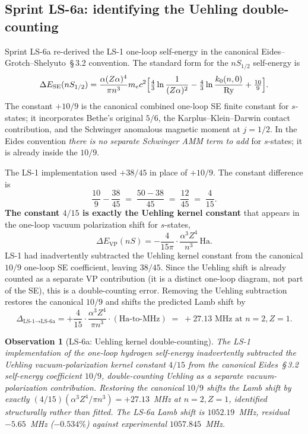 \documentclass[11pt]{article}
\newtheorem{observation}{Observation}
\begin{document}
\subsection{Sprint LS-6a: identifying the Uehling double-counting}

Sprint LS-6a re-derived the LS-1 one-loop self-energy in the canonical
Eides--Grotch--Shelyuto~\S\,3.2 convention.  The standard form for
the $nS_{1/2}$ self-energy is
\begin{equation}
\label{eq:eides_se}
\Delta E_\text{SE}(nS_{1/2}) = \frac{\alpha (Z\alpha)^4}{\pi n^3} m_e c^2
\Bigl[\tfrac{4}{3} \ln\frac{1}{(Z\alpha)^2}
- \tfrac{4}{3} \ln\frac{k_0(n, 0)}{\mathrm{Ry}}
+ \tfrac{10}{9}\Bigr].
\end{equation}
The constant $+10/9$ is the canonical combined one-loop SE finite
constant for $s$-states; it incorporates Bethe's original $5/6$, the
Karplus--Klein--Darwin contact contribution, and the Schwinger
anomalous magnetic moment at $j = 1/2$.  In the Eides convention
\emph{there is no separate Schwinger AMM term to add} for $s$-states;
it is already inside the $10/9$.

The LS-1 implementation used $+38/45$ in place of $+10/9$.  The
constant difference is
\begin{equation}
\label{eq:ls1_constant_difference}
\frac{10}{9} - \frac{38}{45} \;=\; \frac{50 - 38}{45} \;=\; \frac{12}{45} \;=\; \frac{4}{15}.
\end{equation}
\textbf{The constant $4/15$ is exactly the Uehling kernel constant}
that appears in the one-loop vacuum polarization shift for
$s$-states,
\begin{equation}
\label{eq:uehling_vp}
\Delta E_\text{VP}(nS) = -\frac{4}{15\pi} \cdot \frac{\alpha^3 Z^4}{n^3} \, \mathrm{Ha}.
\end{equation}
LS-1 had inadvertently subtracted the Uehling kernel constant from
the canonical $10/9$ one-loop SE coefficient, leaving $38/45$.  Since
the Uehling shift is already counted as a separate VP contribution
(it is a distinct one-loop diagram, not part of the SE), this is a
double-counting error.  Removing the Uehling subtraction restores the
canonical $10/9$ and shifts the predicted Lamb shift by
\begin{equation}
\label{eq:shift_value}
\Delta_{\text{LS-1} \to \text{LS-6a}} = +\frac{4}{15} \cdot
\frac{\alpha^3 Z^4}{\pi n^3} \cdot (\text{Ha-to-MHz})
\;=\; +27.13 \text{ MHz at } n = 2, Z = 1.
\end{equation}

\begin{observation}[LS-6a: Uehling kernel double-counting]
\label{obs:uehling_double}
The LS-1 implementation of the one-loop hydrogen self-energy
inadvertently subtracted the Uehling vacuum-polarization kernel
constant $4/15$ from the canonical Eides~\S\,3.2 self-energy
coefficient $10/9$, double-counting Uehling as a separate
vacuum-polarization contribution.  Restoring the canonical $10/9$
shifts the Lamb shift by exactly $(4/15)(\alpha^3 Z^4 / \pi n^3) =
+27.13$~MHz at $n = 2, Z = 1$, identified structurally rather than
fitted.  The LS-6a Lamb shift is $1052.19$~MHz, residual $-5.65$~MHz
($-0.534\%$) against experimental $1057.845$~MHz.
\end{observation}
\end{document}
